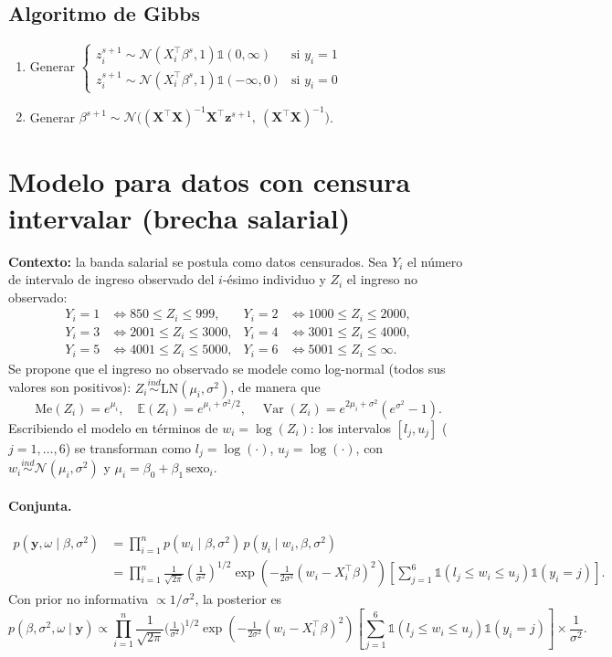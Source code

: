 \documentclass[11pt]{article}
\newcommand{\N}{\mathcal{N}}
\newcommand{\E}{\mathbb{E}}
\newcommand{\Var}{\operatorname{Var}}
\newcommand{\ind}{\mathbb{1}}
\newcommand{\bX}{\mathbf{X}}
\newcommand{\by}{\mathbf{y}}
\newcommand{\bz}{\mathbf{z}}
\theoremstyle{definition}
\begin{document}
\subsection{Algoritmo de Gibbs}
\begin{enumerate}[leftmargin=2em]
  \item Generar $\begin{cases}z_i^{s+1}\sim\N(X_i^{\top}\beta^s,1)\ind(0,\infty) & \text{si }y_i=1\\ z_i^{s+1}\sim\N(X_i^{\top}\beta^s,1)\ind(-\infty,0) & \text{si }y_i=0\end{cases}$
  \item Generar $\beta^{s+1}\sim\N\big((\bX^{\top}\bX)^{-1}\bX^{\top}\bz^{s+1},\ (\bX^{\top}\bX)^{-1}\big)$.
\end{enumerate}

\section{Modelo para datos con censura intervalar (brecha salarial)}
\textbf{Contexto:} la banda salarial se postula como datos censurados. Sea $Y_i$ el número de intervalo de ingreso observado del $i$-ésimo individuo y $Z_i$ el ingreso no observado:
\[
\begin{aligned}
Y_i=1 &\iff 850\le Z_i\le 999, & Y_i=2 &\iff 1000\le Z_i\le 2000,\\
Y_i=3 &\iff 2001\le Z_i\le 3000, & Y_i=4 &\iff 3001\le Z_i\le 4000,\\
Y_i=5 &\iff 4001\le Z_i\le 5000, & Y_i=6 &\iff 5001\le Z_i\le\infty.
\end{aligned}
\]
Se propone que el ingreso no observado se modele como log-normal (todos sus valores son positivos): $Z_i\overset{ind}{\sim}\text{LN}(\mu_i,\sigma^2)$, de manera que
\[
\text{Me}(Z_i)=e^{\mu_i},\quad \E(Z_i)=e^{\mu_i+\sigma^2/2},\quad \Var(Z_i)=e^{2\mu_i+\sigma^2}(e^{\sigma^2}-1).
\]
Escribiendo el modelo en términos de $w_i=\log(Z_i)$: los intervalos $[l_j,u_j]$ ($j=1,\dots,6$) se transforman como $l_j=\log(\cdot)$, $u_j=\log(\cdot)$, con $w_i\overset{ind}{\sim}\N(\mu_i,\sigma^2)$ y $\mu_i=\beta_0+\beta_1\,\text{sexo}_i$.

\paragraph{Conjunta.}
\begin{align*}
p(\by,\omega\mid\beta,\sigma^2)&=\prod_{i=1}^n p(w_i\mid\beta,\sigma^2)\,p(y_i\mid w_i,\beta,\sigma^2)\\
&=\prod_{i=1}^n\frac{1}{\sqrt{2\pi}}\left(\frac{1}{\sigma^2}\right)^{1/2}\exp\!\left(-\frac{1}{2\sigma^2}(w_i-X_i^{\top}\beta)^2\right)\left[\sum_{j=1}^6\ind(l_j\le w_i\le u_j)\ind(y_i=j)\right].
\end{align*}
Con prior no informativa $\propto 1/\sigma^2$, la posterior es
\[
p(\beta,\sigma^2,\omega\mid\by)\propto\prod_{i=1}^n\frac{1}{\sqrt{2\pi}}\Big(\tfrac{1}{\sigma^2}\Big)^{1/2}\exp\!\left(-\tfrac{1}{2\sigma^2}(w_i-X_i^{\top}\beta)^2\right)\left[\sum_{j=1}^6\ind(l_j\le w_i\le u_j)\ind(y_i=j)\right]\times\frac{1}{\sigma^2}.
\]
\end{document}

